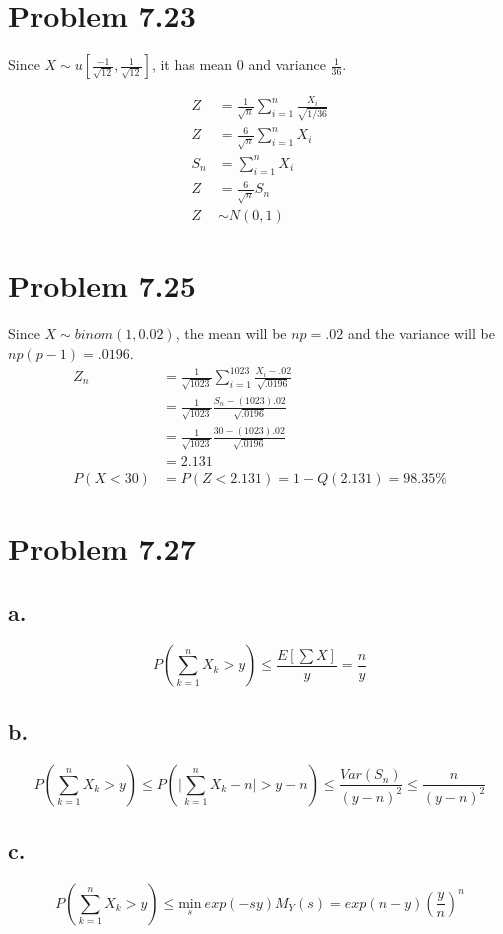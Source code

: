 \documentclass[12pt]{article}
\begin{document}
\section{Problem 7.23}
Since $X\sim u\left[ \frac{-1}{\sqrt{12}},\frac{1}{\sqrt{12}} \right]$, it has mean 0 and variance $\frac{1}{36}$.

\begin{align*}
  Z &= \frac{1}{\sqrt{n}} \sum_{i=1}^n \frac{X_i}{\sqrt{1/36}} \\
  Z &= \frac{6}{\sqrt{n}} \sum_{i=1}^n X_i \\
  S_n &= \sum_{i=1}^n X_i \\
  Z &= \frac{6}{\sqrt{n}} S_n \\
  Z &\sim N(0,1)
\end{align*}

\section{Problem 7.25}
Since $X\sim binom(1,0.02)$, the mean will be $np = .02$ and the variance will be $np(p-1) = .0196$.
\begin{align*}
  Z_n &= \frac{1}{\sqrt{1023}} \sum_{i=1}^{1023} \frac{X_i-.02}{\sqrt{.0196}} \\
  &= \frac{1}{\sqrt{1023}} \frac{S_n-(1023).02}{\sqrt{.0196}} \\
  &= \frac{1}{\sqrt{1023}} \frac{30-(1023).02}{\sqrt{.0196}} \\
  &= 2.131 \\
  P(X<30) &= P(Z<2.131) = 1- Q(2.131) = 98.35 \%
\end{align*}

\section{Problem 7.27}
\subsection{a.}
\[
  P\left( \sum_{k=1}^n X_k >y \right) \leq \frac{E\left[ \sum X \right]}{y} = \frac{n}{y}
\]
\subsection{b.}
\[
  P(\sum_{k=1}^n X_k > y) \leq P(\big|\sum_{k=1}^n X_k - n\big| > y-n) \leq \frac{Var(S_n)}{(y-n)^2} \leq \frac{n}{(y-n)^2}
\]
\subsection{c.}
\[
  P(\sum_{k=1}^n X_k > y) \leq \underset{s}{\text{min}} \ exp(-sy)M_Y(s) = exp(n-y)\left( \frac{y}{n} \right)^n
\]
\end{document}
